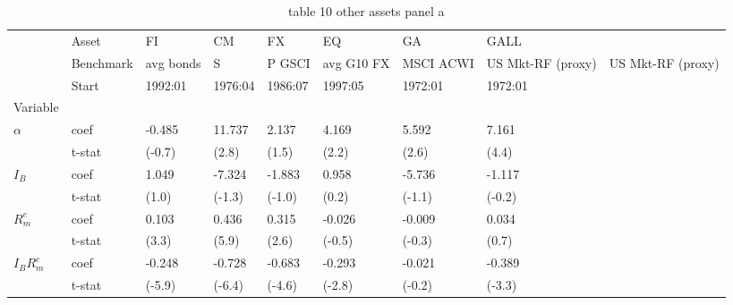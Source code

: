 \begin{table}[htbp]
  \centering
  \caption{table 10 other assets panel a}
  \label{tab:table_10_other_assets_panel_a}
  \begin{tabular}{llllllll}
\toprule
 & Asset & FI & CM & FX & EQ & GA & GALL \\
 & Benchmark & avg bonds & S&P GSCI & avg G10 FX & MSCI ACWI & US Mkt-RF (proxy) & US Mkt-RF (proxy) \\
 & Start & 1992:01 & 1976:04 & 1986:07 & 1997:05 & 1972:01 & 1972:01 \\
Variable &  &  &  &  &  &  &  \\
\midrule
{} & coef & -0.485 & 11.737 & 2.137 & 4.169 & 5.592 & 7.161 \\
 & t-stat & (-0.7) & (2.8) & (1.5) & (2.2) & (2.6) & (4.4) \\
 & coef & 1.049 & -7.324 & -1.883 & 0.958 & -5.736 & -1.117 \\
 & t-stat & (1.0) & (-1.3) & (-1.0) & (0.2) & (-1.1) & (-0.2) \\
 & coef & 0.103 & 0.436 & 0.315 & -0.026 & -0.009 & 0.034 \\
 & t-stat & (3.3) & (5.9) & (2.6) & (-0.5) & (-0.3) & (0.7) \\
 & coef & -0.248 & -0.728 & -0.683 & -0.293 & -0.021 & -0.389 \\
 & t-stat & (-5.9) & (-6.4) & (-4.6) & (-2.8) & (-0.2) & (-3.3) \\
\bottomrule
\end{tabular}

\end{table}
